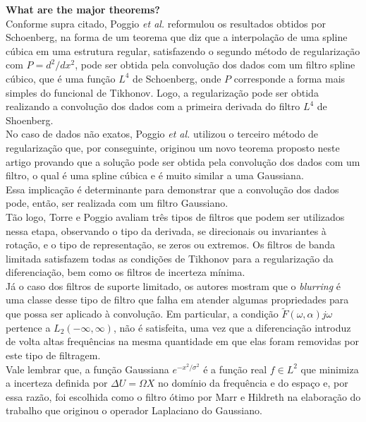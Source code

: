 \begin{enumerate}
\begin{enumerate}[label*=\arabic*.]
    \textbf{What are the major theorems?}\\
    Conforme supra citado, Poggio \textit{et al.} \cite{Poggio1988106} reformulou os resultados obtidos por Schoenberg, na forma de um teorema que diz que a interpolação de uma spline cúbica em uma estrutura regular, satisfazendo o segundo método de regularização com $P = d^2 / dx^2$, pode ser obtida pela convolução dos dados com um filtro spline cúbico, que é uma função $L^4$ de Schoenberg, onde $P$ corresponde a forma mais simples do funcional de Tikhonov. Logo, a regularização pode ser obtida realizando a convolução dos dados com a primeira derivada do filtro $L^4$ de Shoenberg.\\
    No caso de dados não exatos, Poggio \textit{et al.} \cite{Poggio1988106} utilizou o terceiro método de regularização que, por conseguinte, originou um novo teorema proposto neste artigo provando que a solução pode ser obtida pela convolução dos dados com um filtro, o qual é uma spline cúbica e é muito similar a uma Gaussiana.\\
    Essa implicação é determinante para demonstrar que a convolução dos dados pode, então, ser realizada com um filtro Gaussiano.\\
    Tão logo, Torre e Poggio avaliam três tipos de filtros que podem ser utilizados nessa etapa, observando o tipo da derivada, se direcionais ou invariantes à rotação, e o tipo de representação, se zeros ou extremos. Os filtros de banda limitada satisfazem todas as condições de Tikhonov para a regularização da diferenciação, bem como os filtros de incerteza mínima.\\
    Já o caso dos filtros de suporte limitado, os autores mostram que o \textit{blurring} é uma classe desse tipo de filtro que falha em atender algumas propriedades para que possa ser aplicado à convolução. Em particular, a condição $\tilde{F}(\omega, \alpha) j\omega$ pertence a $L_{2}(-\infty, \infty)$, não é satisfeita, uma vez que a diferenciação introduz de volta altas frequências na mesma quantidade em que elas foram removidas por este tipo de filtragem.\\
    Vale lembrar que, a função Gaussiana $e^{-x^2/\sigma^2}$ é a função real $f \in L^2$ que minimiza a incerteza definida por $\Delta U = \Omega X$ no domínio da frequência e do espaço e, por essa razão, foi escolhida como o filtro ótimo por Marr e Hildreth na elaboração do trabalho que originou o operador Laplaciano do Gaussiano.\\
    

\end{enumerate}
\end{enumerate}
